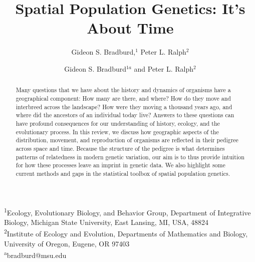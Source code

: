 \documentclass{ar-1col}
\begin{document}
\ifsubmissionversion
{}
\fi

\title{Spatial Population Genetics: It's About Time}

\ifsubmissionversion
\author{Gideon S. Bradburd,$^1$ Peter L. Ralph$^2$
}
\else

\author{Gideon S. Bradburd$^{1a}$ and Peter L. Ralph$^2$}
\maketitle

\noindent\textsuperscript{1}Ecology, Evolutionary Biology, and Behavior Group, Department of Integrative Biology, Michigan State University, East Lansing, MI, USA, 48824\\

\noindent\textsuperscript{2}Institute of Ecology and Evolution, Departments of Mathematics and Biology, University of Oregon, Eugene, OR 97403\\

\noindent\textsuperscript{a}bradburd@msu.edu\\
\fi

\begin{abstract}
    Many questions that we have about the history and dynamics of organisms
    have a geographical component:
    How many are there, and where?
    How do they move and interbreed across the landscape?
    How were they moving a thousand years ago,
    and where did the ancestors of an individual today live?
    Answers to these questions can have profound consequences
    for our understanding of history, ecology, and the evolutionary process.
    In this review, we discuss how geographic aspects of the 
    distribution, movement, and reproduction of organisms
    are reflected in their pedigree across space and time.
    Because the structure of the pedigree is what determines 
    patterns of relatedness in modern genetic variation,
    our aim is to thus provide intuition for how these processes
    leave an imprint in genetic data.
    We also highlight some current methods and gaps 
    in the statistical toolbox of spatial population genetics.
\end{abstract}
\end{document}
